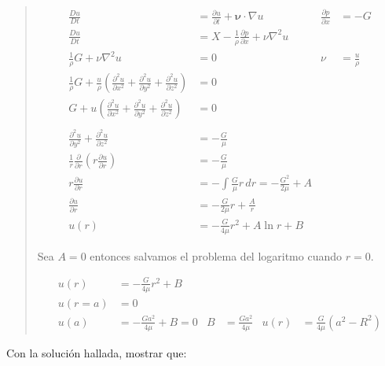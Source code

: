 \documentclass[a4paper,10pt,twoside,final,spanish]{article}
\begin{document}
\begin{quote}
\begin{tcolorbox}[colback=gray!10!white,colframe=black!0!white]

\begin{align*}
\frac{Du}{Dt} &= \frac{\partial u}{\partial t}+\mathbf{\nu}\cdot\nabla u
& \frac{\partial p}{\partial x} &= -G \\
\frac{Du}{Dt} &= X-\frac{1}{\rho}\frac{\partial p}{\partial x}+\nu\nabla^{2}u \\
\frac{1}{\rho}G+\nu\nabla^{2}u &= 0 
& \nu &= \frac{u}{\rho} \\
\frac{1}{\rho}G+\frac{u}{\rho}\left(\frac{\partial^{2}u}{\partial x^{2}}
+\frac{\partial^{2}u}{\partial y^{2}}+\frac{\partial^{2}u}{\partial z^{2}}\right) &= 0 \\
G+u\left(\frac{\partial^{2}u}{\partial x^{2}}+\frac{\partial^{2}u}{\partial y^{2}}
+\frac{\partial^{2}u}{\partial z^{2}}\right) &= 0 \\ \\
\frac{\partial^{2}u}{\partial y^{2}}+\frac{\partial^{2}u}{\partial z^{2}} &= -\frac{G}{\mu} \\
\frac{1}{r}\frac{\partial}{\partial r}\left(r\frac{\partial u}{\partial r}\right)
&= -\frac{G}{\mu} \\
r\frac{\partial u}{\partial r} &= -\int\frac{G}{\mu}r\,dr=-\frac{G^{2}}{2\mu}+A \\
\frac{\partial u}{\partial r} &= -\frac{G}{2\mu}r+\frac{A}{r} \\
u(r) &= -\frac{G}{4\mu}r^{2}+A\ln{r}+B
\end{align*}

Sea $A=0$ entonces salvamos el problema del logaritmo cuando $r=0$.

\begin{align*}
u(r) &= -\frac{G}{4\mu}r^{2}+B \\
u(r=a) &= 0 \\
u(a) &= -\frac{Ga^{2}}{4\mu}+B=0 & B &= \frac{Ga^{2}}{4\mu}
& u(r) &= \frac{G}{4\mu}(a^{2}-R^{2})
\end{align*}

\end{tcolorbox}
\end{quote}

Con la solución hallada, mostrar que:
\end{document}
